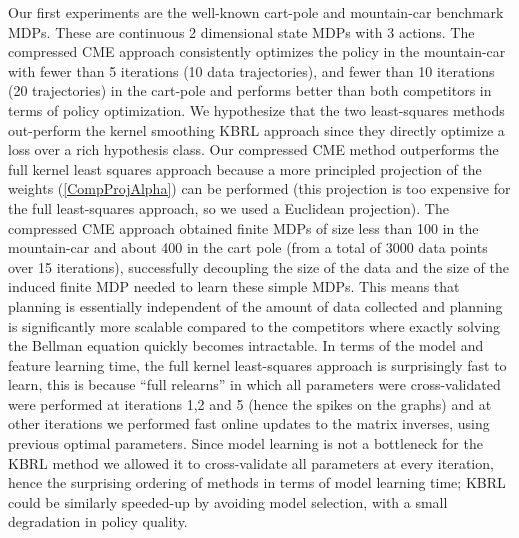 \documentclass[letterpaper]{article}
\begin{document}
Our first experiments are the well-known cart-pole and mountain-car benchmark MDPs. These are continuous 2 dimensional state MDPs with 3 actions. The compressed CME approach consistently optimizes the policy in the mountain-car with fewer than 5 iterations (10 data trajectories), and fewer than 10 iterations (20 trajectories) in the cart-pole and performs better than both competitors in terms of policy optimization. We hypothesize that the two least-squares methods out-perform the kernel smoothing KBRL approach since they directly optimize a loss over a rich hypothesis class. Our compressed CME method outperforms the full kernel least squares approach because a more principled projection of the weights (\ref{CompProjAlpha}) can be performed (this projection is too expensive for the full least-squares approach, so we used a Euclidean projection). The compressed CME approach obtained finite MDPs of size less than 100 in the mountain-car and about 400 in the cart pole (from a total of 3000 data points over 15 iterations), successfully decoupling the size of the data and the size of the induced finite MDP needed to learn these simple MDPs. This means that planning is essentially independent of the amount of data collected and planning is significantly more scalable compared to the competitors where exactly solving the Bellman equation quickly becomes intractable. In terms of the model and feature learning time, the full kernel least-squares approach is surprisingly fast to learn, this is because ``full relearns'' in which all parameters were cross-validated were performed at iterations 1,2 and 5 (hence the spikes on the graphs) and at other iterations we performed fast online updates to the matrix inverses, using previous optimal parameters. Since model learning is not a bottleneck for the KBRL method we allowed it to cross-validate all parameters at every iteration, hence the surprising ordering of methods in terms of model learning time; KBRL could be similarly speeded-up by avoiding model selection, with a small degradation in policy quality.
\end{document}
